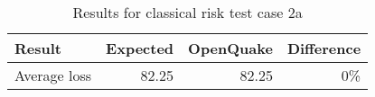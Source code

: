\begin{table}[htbp]

\centering
\begin{tabular}{ l r r r }

\hline
\rowcolor{anti-flashwhite}
\bf{Result} & \bf{Expected} & \bf{OpenQuake} & \bf{Difference}\\
\hline
Average loss & 82.25 & 82.25 & 0\% \\
\hline
\end{tabular}

\caption{Results for classical risk test case 2a}
\label{tab:result-cr-2a}
\end{table}